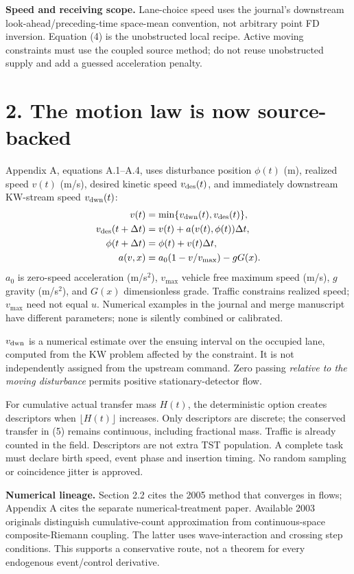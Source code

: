 \documentclass[11pt,a4paper]{article}
\begin{document}
\textbf{Speed and receiving scope.} Lane-choice speed uses the journal's
downstream look-ahead/preceding-time space-mean convention, not arbitrary point
FD inversion. Equation (4) is the unobstructed local recipe. Active moving
constraints must use the coupled source method; do not reuse unobstructed
supply and add a guessed acceleration penalty.

\newpage
\section*{2. The motion law is now source-backed}
Appendix A, equations A.1--A.4, uses disturbance position $\phi(t)$ (m),
realized speed $v(t)$ (m/s), desired kinetic speed $v_{\rm des}(t)$, and
immediately downstream KW-stream speed $v_{\rm dwn}(t)$:
\begin{align}
v(t)&=\min\{v_{\rm dwn}(t),v_{\rm des}(t)\},\\
v_{\rm des}(t+\Delta t)&=v(t)+a(v(t),\phi(t))\Delta t,\\
\phi(t+\Delta t)&=\phi(t)+v(t)\Delta t,\\
a(v,x)&=a_0(1-v/v_{\max})-gG(x).
\end{align}
$a_0$ is zero-speed acceleration (m/s$^2$), $v_{\max}$ vehicle free maximum
speed (m/s), $g$ gravity (m/s$^2$), and $G(x)$ dimensionless grade. Traffic
constrains realized speed; $v_{\max}$ need not equal $u$. Numerical examples
in the journal and merge manuscript have different parameters; none is
silently combined or calibrated.

$v_{\rm dwn}$ is a numerical estimate over the ensuing interval on the
occupied lane, computed from the KW problem affected by the constraint.
It is not independently assigned from the upstream command. Zero passing
\emph{relative to the moving disturbance} permits positive stationary-detector flow.

For cumulative actual transfer mass $H(t)$, the deterministic option creates
descriptors when $\lfloor H(t)\rfloor$ increases. Only descriptors are discrete;
the conserved transfer in (5) remains continuous, including fractional mass.
Traffic is already counted in the field. Descriptors are not extra TST
population. A complete task must declare birth speed, event phase and insertion
timing. No random sampling or coincidence jitter is approved.

\textbf{Numerical lineage.} Section 2.2 cites the 2005 method that converges
in flows; Appendix A cites the separate numerical-treatment paper. Available
2003 originals distinguish cumulative-count approximation from continuous-space
composite-Riemann coupling. The latter uses wave-interaction and crossing step
conditions. This supports a conservative route, not a theorem for every
endogenous event/control derivative.
\end{document}
